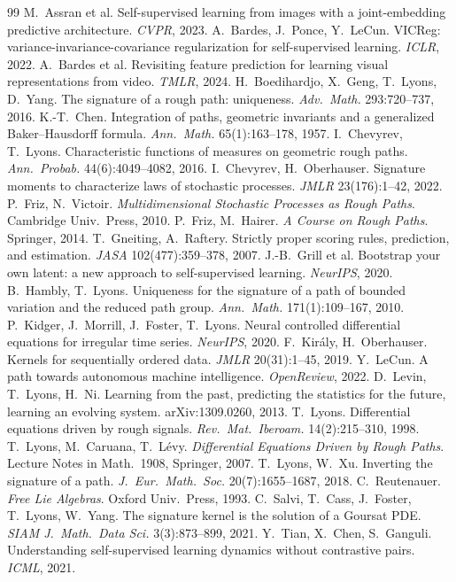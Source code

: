 \documentclass[10pt,twocolumn]{article}
\begin{document}
\footnotesize
\begin{thebibliography}{99}\setlength{\itemsep}{0pt}
 M.~Assran et al. Self-supervised learning from images with a joint-embedding predictive architecture. \emph{CVPR}, 2023.
 A.~Bardes, J.~Ponce, Y.~LeCun. VICReg: variance-invariance-covariance regularization for self-supervised learning. \emph{ICLR}, 2022.
 A.~Bardes et al. Revisiting feature prediction for learning visual representations from video. \emph{TMLR}, 2024.
 H.~Boedihardjo, X.~Geng, T.~Lyons, D.~Yang. The signature of a rough path: uniqueness. \emph{Adv.\ Math.} 293:720--737, 2016.
 K.-T.~Chen. Integration of paths, geometric invariants and a generalized Baker--Hausdorff formula. \emph{Ann.\ Math.} 65(1):163--178, 1957.
 I.~Chevyrev, T.~Lyons. Characteristic functions of measures on geometric rough paths. \emph{Ann.\ Probab.} 44(6):4049--4082, 2016.
 I.~Chevyrev, H.~Oberhauser. Signature moments to characterize laws of stochastic processes. \emph{JMLR} 23(176):1--42, 2022.
 P.~Friz, N.~Victoir. \emph{Multidimensional Stochastic Processes as Rough Paths}. Cambridge Univ.\ Press, 2010.
 P.~Friz, M.~Hairer. \emph{A Course on Rough Paths}. Springer, 2014.
 T.~Gneiting, A.~Raftery. Strictly proper scoring rules, prediction, and estimation. \emph{JASA} 102(477):359--378, 2007.
 J.-B.~Grill et al. Bootstrap your own latent: a new approach to self-supervised learning. \emph{NeurIPS}, 2020.
 B.~Hambly, T.~Lyons. Uniqueness for the signature of a path of bounded variation and the reduced path group. \emph{Ann.\ Math.} 171(1):109--167, 2010.
 P.~Kidger, J.~Morrill, J.~Foster, T.~Lyons. Neural controlled differential equations for irregular time series. \emph{NeurIPS}, 2020.
 F.~Kir\'aly, H.~Oberhauser. Kernels for sequentially ordered data. \emph{JMLR} 20(31):1--45, 2019.
 Y.~LeCun. A path towards autonomous machine intelligence. \emph{OpenReview}, 2022.
 D.~Levin, T.~Lyons, H.~Ni. Learning from the past, predicting the statistics for the future, learning an evolving system. arXiv:1309.0260, 2013.
 T.~Lyons. Differential equations driven by rough signals. \emph{Rev.\ Mat.\ Iberoam.} 14(2):215--310, 1998.
 T.~Lyons, M.~Caruana, T.~L\'evy. \emph{Differential Equations Driven by Rough Paths}. Lecture Notes in Math.\ 1908, Springer, 2007.
 T.~Lyons, W.~Xu. Inverting the signature of a path. \emph{J.\ Eur.\ Math.\ Soc.} 20(7):1655--1687, 2018.
 C.~Reutenauer. \emph{Free Lie Algebras}. Oxford Univ.\ Press, 1993.
 C.~Salvi, T.~Cass, J.~Foster, T.~Lyons, W.~Yang. The signature kernel is the solution of a Goursat PDE. \emph{SIAM J.\ Math.\ Data Sci.} 3(3):873--899, 2021.
 Y.~Tian, X.~Chen, S.~Ganguli. Understanding self-supervised learning dynamics without contrastive pairs. \emph{ICML}, 2021.
\end{thebibliography}
\end{document}
